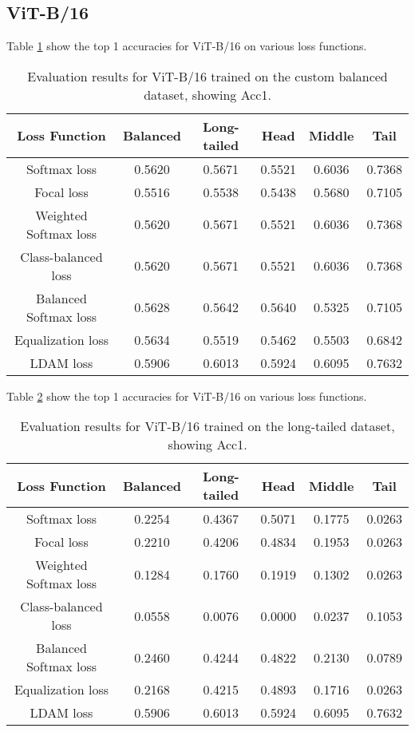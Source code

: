 \subsection{ViT-B/16}

Table \ref{tab:vit_bal_acc1_1} show the top 1 accuracies for ViT-B/16 on various loss functions.

\begin{table}[H]
    \centering
    \begin{tabular}{cccccc}
        \toprule
        Loss Function & Balanced & Long-tailed & Head & Middle & Tail \\ 
        \midrule
        Softmax loss   & 0.5620 & 0.5671 & 0.5521 & 0.6036 & 0.7368 \\
        Focal loss   & 0.5516 & 0.5538 & 0.5438 & 0.5680 & 0.7105 \\
        Weighted Softmax loss   & 0.5620 & 0.5671 & 0.5521 & 0.6036 & 0.7368 \\
        Class-balanced loss   & 0.5620 & 0.5671 &  0.5521 & 0.6036 & 0.7368 \\
        Balanced Softmax loss   & 0.5628 & 0.5642 & 0.5640 & 0.5325 & 0.7105 \\
        Equalization loss   & 0.5634   & 0.5519 & 0.5462 & 0.5503 & 0.6842 \\
        LDAM loss   & 0.5906 &  0.6013 & 0.5924 & 0.6095 & 0.7632 \\
        \bottomrule
    \end{tabular}
    \caption{Evaluation results for ViT-B/16 trained on the custom balanced dataset, showing Acc1.}
    \label{tab:vit_bal_acc1_1}
\end{table}

Table \ref{tab:vit_lt_acc1} show the top 1 accuracies for ViT-B/16 on various loss functions.

\begin{table}[H]
    \centering
    \begin{tabular}{cccccc}
        \toprule
        Loss Function & Balanced & Long-tailed & Head & Middle & Tail \\ 
        \midrule
        Softmax loss   & 0.2254 & 0.4367 & 0.5071 & 0.1775 & 0.0263 \\
        Focal loss   & 0.2210 & 0.4206 & 0.4834 & 0.1953 & 0.0263 \\
        Weighted Softmax loss   & 0.1284 & 0.1760 & 0.1919 & 0.1302 & 0.0263 \\
        Class-balanced loss   & 0.0558 & 0.0076 & 0.0000 & 0.0237 & 0.1053 \\
        Balanced Softmax loss   & 0.2460 & 0.4244 & 0.4822 &  0.2130 & 0.0789 \\
        Equalization loss   & 0.2168 & 0.4215 & 0.4893 & 0.1716 & 0.0263 \\
        LDAM loss   & 0.5906 & 0.6013 & 0.5924 & 0.6095 & 0.7632 \\
        \bottomrule
    \end{tabular}
    \caption{Evaluation results for ViT-B/16 trained on the long-tailed dataset, showing Acc1.}
    \label{tab:vit_lt_acc1}
\end{table}

